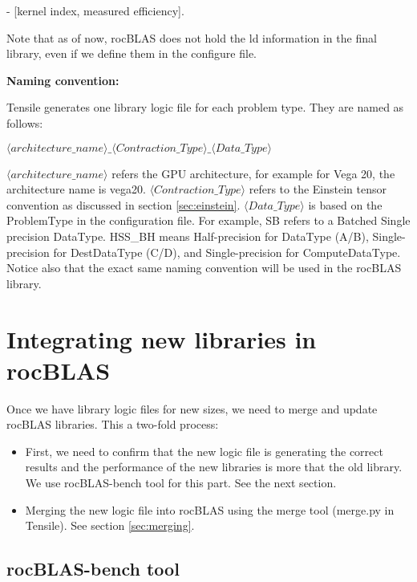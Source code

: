 \documentclass[]{article}
\begin{document}
\begin{center}
	- [kernel index, measured efficiency].
\end{center}

\noindent
Note that as of now, rocBLAS does not hold the ld information in the final library, even if we define them in the configure file.

\bigskip
\noindent

\textbf{\large{Naming convention:}}

\label{sec:naming}
\noindent
Tensile generates one library logic file for each problem type. They are named as follows:
\begin{center}
	$\langle architecture\_name \rangle \_\langle Contraction\_Type \rangle\_ \langle Data\_Type \rangle$
\end{center}

\noindent
$\langle architecture\_name \rangle$ refers the GPU architecture, for example for Vega 20, the architecture name is vega20. $\langle Contraction\_Type \rangle$ refers to the Einstein tensor convention as discussed in section \ref{sec:einstein}. $\langle Data\_Type \rangle$ is based on the ProblemType in the configuration file. For example, SB refers to a Batched Single precision DataType. HSS\_BH means Half-precision for DataType (A/B), Single-precision for DestDataType (C/D), and Single-precision for ComputeDataType. Notice also that the exact same naming convention will be used in the rocBLAS library.

\section{Integrating new libraries in rocBLAS}
Once we have library logic files for new sizes, we need to merge and update rocBLAS libraries. This a two-fold process: 
\begin{itemize}
\item First, we need to confirm that the new logic file is generating the correct results and the performance of the new libraries is more that the old library. We use rocBLAS-bench tool for this part. See the next section. 
\item Merging the new logic file into rocBLAS using the merge tool (merge.py in Tensile). See section \ref{sec:merging}.
\end{itemize}



\subsection{rocBLAS-bench tool}
\end{document}
